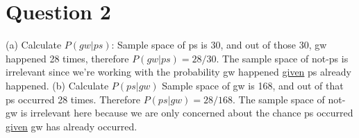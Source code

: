 \documentclass[12pt]{report}
\begin{document}
\section{Question 2}
(a) Calculate $P(gw|ps)$:
\newline
Sample space of ps is 30, and out of those 30, gw happened 28 times, therefore $P(gw|ps) = 28/30$.
\newline
The sample space of not-ps is irrelevant since we're working with the probability gw happened \underline{given} ps already happened.
\newline
\newline
(b) Calculate $P(ps|gw)$
\newline
Sample space of gw is 168, and out of that ps occurred 28 times. Therefore $P(ps|gw) = 28/168$.
\newline
The sample space of not-gw is irrelevant here because we are only concerned about the chance ps occurred \underline{given} gw has already occurred.
\end{document}
